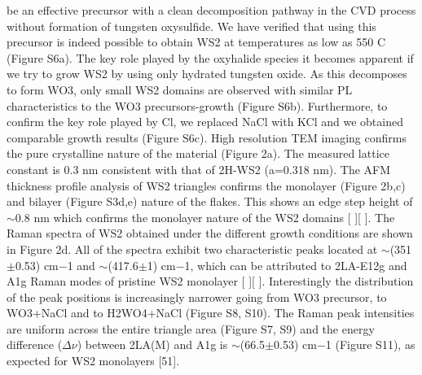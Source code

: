 \documentclass[12pt]{article}
\begin{document}
be an effective precursor with a clean decomposition pathway in the CVD process without formation of tungsten oxysulfide. We have verified that using this precursor is indeed possible to obtain WS2 at temperatures as low as 550 {\degree}C (Figure S6a). The key role played by the oxyhalide species it becomes apparent if we try to grow WS2 by using only hydrated tungsten oxide. As this decomposes to form WO3, only small WS2 domains are observed with similar PL characteristics to the WO3 precursors-growth (Figure S6b). Furthermore, to confirm the key role played by Cl, we replaced NaCl with KCl and we obtained comparable growth results (Figure S6c).
High resolution TEM imaging confirms the pure crystalline nature of the material (Figure 2a). The measured lattice constant is 0.3 nm consistent with that of 2H-WS2 (a=0.318 nm). The AFM thickness profile analysis of WS2 triangles confirms the monolayer (Figure 2b,c) and bilayer (Figure S3d,e) nature of the flakes. This shows an edge step height of {$\sim$}0.8 nm which confirms the monolayer nature of the WS2 domains [ ][ ].                                                                                                                               
The Raman spectra of WS2 obtained under the different growth conditions are shown in Figure 2d. All of the spectra exhibit two characteristic peaks located at {$\sim$}(351{$\pm$}0.53) cm−1 and {$\sim$}(417.6{$\pm$}1) cm−1, which can be attributed to 2LA-E12g and A1g Raman modes of pristine WS2 monolayer [ ][ ]. Interestingly the distribution of the peak positions is increasingly narrower going from WO3 precursor, to WO3+NaCl and to H2WO4+NaCl (Figure S8, S10). The Raman peak intensities are uniform across the entire triangle area (Figure S7, S9) and the energy difference (${\Delta}{\nu}$) between 2LA(M) and A1g is {$\sim$}(66.5{$\pm$}0.53) cm−1 (Figure S11), as expected for WS2 monolayers [51].   
 
\end{document}
